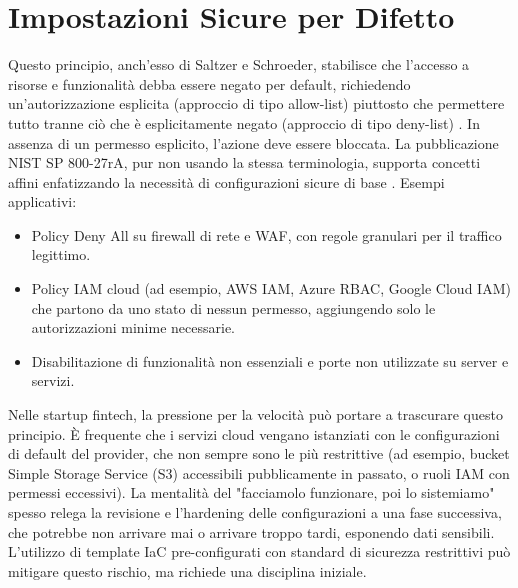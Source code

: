 \section{Impostazioni Sicure per Difetto}
Questo principio, anch'esso di Saltzer e Schroeder, stabilisce che l'accesso a risorse e funzionalità debba essere negato per default, richiedendo un'autorizzazione esplicita (approccio di tipo allow-list) piuttosto che permettere tutto tranne ciò che è esplicitamente negato (approccio di tipo deny-list) \cite{Saltzer_Schroeder_1975}. In assenza di un permesso esplicito, l'azione deve essere bloccata. La pubblicazione NIST SP 800-27rA, pur non usando la stessa terminologia, supporta concetti affini enfatizzando la necessità di configurazioni sicure di base \cite{NIST_SP_800_27rA}.
Esempi applicativi:
\begin{itemize}
\item Policy Deny All su firewall di rete e WAF, con regole granulari per il traffico legittimo.
\item Policy IAM cloud (ad esempio, AWS IAM, Azure RBAC, Google Cloud IAM) che partono da uno stato di nessun permesso, aggiungendo solo le autorizzazioni minime necessarie.
\item Disabilitazione di funzionalità non essenziali e porte non utilizzate su server e servizi.
\end{itemize}
Nelle startup fintech, la pressione per la velocità può portare a trascurare questo principio. È frequente che i servizi cloud vengano istanziati con le configurazioni di default del provider, che non sempre sono le più restrittive (ad esempio, bucket Simple Storage Service (S3) accessibili pubblicamente in passato, o ruoli IAM con permessi eccessivi). La mentalità del "facciamolo funzionare, poi lo sistemiamo" spesso relega la revisione e l'hardening delle configurazioni a una fase successiva, che potrebbe non arrivare mai o arrivare troppo tardi, esponendo dati sensibili. L'utilizzo di template IaC pre-configurati con standard di sicurezza restrittivi può mitigare questo rischio, ma richiede una disciplina iniziale.
